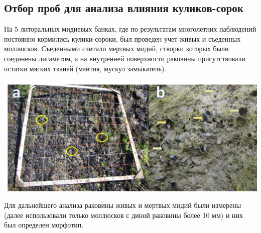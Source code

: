 \documentclass[20pt,a0,portrait]{a0poster}
\begin{document}
\begin{minipage}[t]{0.5\linewidth}
\subsection*{Отбор проб для анализа влияния куликов-сорок}

%
\begin{minipage}[t]{0.4\linewidth}
На 5 литоральных мидиевых банках, где по результатам многолетних наблюдений постоянно кормились кулики-сороки, был проведен учет живых и съеденных моллюсков. Съеденными считали мертвых мидий, створки которых были соединены лигаметом, а на внутренней поверхности раковины присутствовали остатки мягких тканей (мантия, мускул замыкатель).  
\end{minipage}\hspace{1cm}
%
\begin{minipage}[t]{0.5\linewidth}		
	\begin{center}\vspace{0.1cm}
			\includegraphics[width=0.8\linewidth]{Samples_oystercatchers.jpg}
			\label{Fig_setup}
		\end{center}
\end{minipage}

\vspace{0.5cm}


Для дальнейшего анализа раковины живых и мертвых мидий были измерены (далее использовали только моллюсков с диной раковины более 10 мм) и них был определен морфотип.  



\end{minipage}









\end{document}
